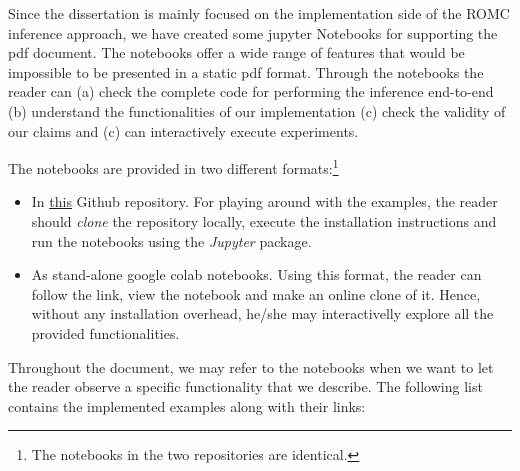 Since the dissertation is mainly focused on the implementation side of
the ROMC inference approach, we have created some jupyter Notebooks
for supporting the pdf document. The notebooks offer a wide range of
features that would be impossible to be presented in a static pdf
format. Through the notebooks the reader can (a) check the complete
code for performing the inference end-to-end (b) understand the
functionalities of our implementation (c) check the validity of our
claims and (c) can interactively execute experiments.

The notebooks are provided in two different formats:\footnote{The
  notebooks in the two repositories are identical.}

\begin{itemize}
\item In \href{https://github.com/givasile/edinburgh-thesis/tree/master/notebook_examples}{this} Github repository. For
  playing around with the examples, the reader should \textit{clone} the
  repository locally, execute the installation instructions and run the
  notebooks using the \textit{Jupyter} package.
\item As stand-alone google colab notebooks. Using this format, the
  reader can follow the link, view the notebook and make an online
  clone of it. Hence, without any installation overhead, he/she may
  interactivelly explore all the provided functionalities.
\end{itemize}


Throughout the document, we may refer to the notebooks when we want to
let the reader observe a specific functionality that we describe. The
following list contains the implemented examples along with their
links:

